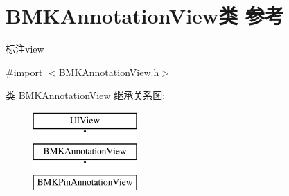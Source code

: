 \hypertarget{interface_b_m_k_annotation_view}{}\section{B\+M\+K\+Annotation\+View类 参考}
\label{interface_b_m_k_annotation_view}


标注view  




{\ttfamily \#import $<$B\+M\+K\+Annotation\+View.\+h$>$}

类 B\+M\+K\+Annotation\+View 继承关系图\+:\begin{figure}[H]
\begin{center}
\leavevmode
\includegraphics[height=3.000000cm]{interface_b_m_k_annotation_view}
\end{center}
\end{figure}

